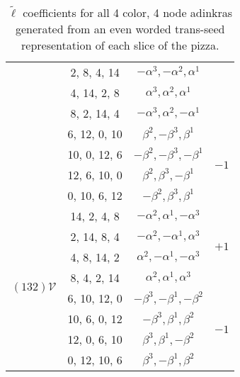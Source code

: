 \begin{table}[!htbp]
\begin{tabular}{|c|c|c|c|}
			\cline{2-3}
			&2, 8, 4, 14& $-\alpha ^3,-\alpha ^2,\alpha ^1$& \\
			\cline{2-3} 
			&4, 14, 2, 8& $\alpha ^3,\alpha ^2,\alpha ^1$ & \\
			\cline{2-3} 
			&8, 2, 14, 4&  $-\alpha ^3,\alpha ^2,-\alpha ^1$  & \\
			\cline{2-4} 
			&6, 12, 0, 10& $\beta ^2,-\beta ^3,\beta ^1$   & \multirow{4}{*}{$-1$} \\
			\cline{2-3} 
			&10, 0, 12, 6& $-\beta ^2,-\beta ^3,-\beta ^1$   & \\
			\cline{2-3} 
			&12, 6, 10, 0& $\beta ^2,\beta ^3,-\beta ^1$   & \\
			\cline{2-3} 
			&0, 10, 6, 12& $-\beta ^2,\beta ^3,\beta ^1$ & \\
			\hline
			\hline
			\multirow{8}{*}{$(132)\mathcal{V}$} & 14, 2, 4, 8 & $-\alpha ^2,\alpha ^1,-\alpha ^3$ & \multirow{4}{*}{$+1$}\\
			\cline{2-3}
			&2, 14, 8, 4& $-\alpha ^2,-\alpha ^1,\alpha ^3$ & \\
			\cline{2-3} 
			&4, 8, 14, 2& $\alpha ^2,-\alpha ^1,-\alpha ^3$ & \\
			\cline{2-3} 
			&8, 4, 2, 14&  $\alpha ^2,\alpha ^1,\alpha ^3$   & \\
			\cline{2-4} 
			&6, 10, 12, 0&  $-\beta ^3,-\beta ^1,-\beta ^2$  & \multirow{4}{*}{$-1$}\\
			\cline{2-3} 
			&10, 6, 0, 12&  $-\beta ^3,\beta ^1,\beta ^2$  & \\
			\cline{2-3} 
			&12, 0, 6, 10&  $\beta ^3,\beta ^1,-\beta ^2$  & \\
			\cline{2-3} 
			&0, 12, 10, 6& $\beta ^3,-\beta ^1,\beta ^2$ & \\
			\hline
			\hline
	\end{tabular}
	\caption{$\tilde{\ell}$ coefficients for all 4 color, 4 node adinkras generated from an even worded trans-seed representation of each slice of the pizza. }
\end{table}
